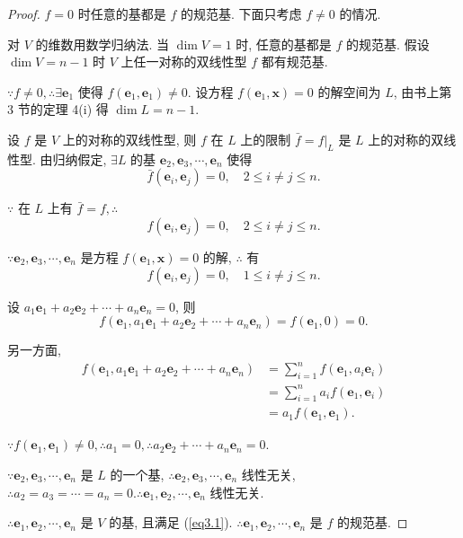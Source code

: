 \documentclass[color=black,device=normal,lang=cn,mode=geye]{elegantnote}
\begin{document}
\begin{proof}
    $f=0$ 时任意的基都是 $f$ 的规范基. 下面只考虑 $f\neq0$ 的情况.

    对 $V$ 的维数用数学归纳法. 当 $\dim V=1$ 时, 任意的基都是 $f$ 的规范基. 假设 $\dim V=n-1$ 时 $V$ 上任一对称的双线性型 $f$ 都有规范基.

    $\because f\neq0,\therefore\exists\boldsymbol{e}_1$ 使得 $f(\boldsymbol{e}_1,\boldsymbol{e}_1)\neq0$. 设方程 $f(\boldsymbol{e}_1,\boldsymbol{x})=0$ 的解空间为 $L$, 由书上第 3 节的定理 4(i) 得 $\dim L=n-1$.
    
    设 $f$ 是 $V$ 上的对称的双线性型, 则 $f$ 在 $L$ 上的限制 $\bar{f}=f|_L$ 是 $L$ 上的对称的双线性型. 由归纳假定, $\exists L$ 的基 $\boldsymbol{e}_2,\boldsymbol{e}_3,\cdots,\boldsymbol{e}_n$ 使得
    \[\bar{f}(\boldsymbol{e}_i,\boldsymbol{e}_j)=0,\quad2\leq i\neq j\leq n.\]

    $\because$ 在 $L$ 上有 $\bar{f}=f,\therefore$
    \[f(\boldsymbol{e}_i,\boldsymbol{e}_j)=0,\quad2\leq i\neq j\leq n.\]

    $\because\boldsymbol{e}_2,\boldsymbol{e}_3,\cdots,\boldsymbol{e}_n$ 是方程 $f(\boldsymbol{e}_1,\boldsymbol{x})=0$ 的解, $\therefore$ 有
    \begin{equation}\label{eq3.1}
        f(\boldsymbol{e}_i,\boldsymbol{e}_j)=0,\quad1\leq i\neq j\leq n.
    \end{equation}
    
    设 $a_1\boldsymbol{e}_1+a_2\boldsymbol{e}_2+\cdots+a_n\boldsymbol{e}_n=0$, 则
    \[f(\boldsymbol{e}_1,a_1\boldsymbol{e}_1+a_2\boldsymbol{e}_2+\cdots+a_n\boldsymbol{e}_n)=f(\boldsymbol{e}_1,0)=0.\]

    另一方面,
    \begin{align*}
        f(\boldsymbol{e}_1,a_1\boldsymbol{e}_1+a_2\boldsymbol{e}_2+\cdots+a_n\boldsymbol{e}_n) & =\sum\limits_{i=1}^nf(\boldsymbol{e}_1,a_i\boldsymbol{e}_i) \\
        & =\sum\limits_{i=1}^na_if(\boldsymbol{e}_1,\boldsymbol{e}_i) \\
        & =a_1f(\boldsymbol{e}_1,\boldsymbol{e}_1).
    \end{align*}

    $\because f(\boldsymbol{e}_1,\boldsymbol{e}_1)\neq0,\therefore a_1=0,\therefore a_2\boldsymbol{e}_2+\cdots+a_n\boldsymbol{e}_n=0$.

    $\because\boldsymbol{e}_2,\boldsymbol{e}_3,\cdots,\boldsymbol{e}_n$ 是 $L$ 的一个基, $\therefore\boldsymbol{e}_2,\boldsymbol{e}_3,\cdots,\boldsymbol{e}_n$ 线性无关, $\therefore a_2=a_3=\cdots=a_n=0.\therefore\boldsymbol{e}_1,\boldsymbol{e}_2,\cdots,\boldsymbol{e}_n$ 线性无关.

    $\therefore\boldsymbol{e}_1,\boldsymbol{e}_2,\cdots,\boldsymbol{e}_n$ 是 $V$ 的基, 且满足 (\ref{eq3.1}). $\therefore\boldsymbol{e}_1,\boldsymbol{e}_2,\cdots,\boldsymbol{e}_n$ 是 $f$ 的规范基.
\end{proof}
\end{document}

